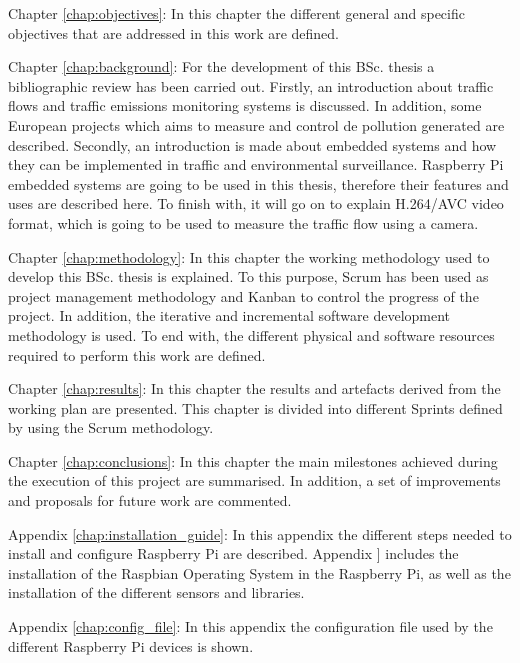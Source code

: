 \begin{definitionlist}
	\item[Chapter \ref{chap:objectives}: \nameref{chap:objectives}] In this chapter the different general and specific objectives that are addressed in this work are defined.
	
	\item[Chapter \ref{chap:background}: \nameref{chap:background}] For the development of this \ac{BSc.} thesis a bibliographic review has been carried out. Firstly, an introduction about traffic flows and traffic emissions monitoring systems is discussed. In addition, some European projects which aims to measure and control de pollution generated are described. Secondly, an introduction is made about embedded systems and how they can be implemented in traffic and environmental surveillance. Raspberry Pi embedded systems are going to be used in this thesis, therefore their features and uses are described here. To finish with, it will go on to explain H.264/AVC video format, which is going to be used to measure the traffic flow using a camera.
	
	\item[Chapter \ref{chap:methodology}: \nameref{chap:methodology}] In this chapter the working methodology used to develop this \ac{BSc.} thesis is explained. To this purpose, Scrum has been used as project management methodology and Kanban to control the progress of the project. In addition, the iterative and incremental software development methodology is used. To end with, the different physical and software resources required to perform this work are defined.
	
	\item[Chapter \ref{chap:results}: \nameref{chap:results}] In this chapter the results and artefacts derived from the working plan are presented. This chapter is divided into different Sprints defined by using the Scrum methodology.
	
	\item[Chapter \ref{chap:conclusions}: \nameref{chap:conclusions}] In this chapter the main milestones achieved during the execution of this project are summarised. In addition, a set of improvements and proposals for future work are commented. 
	
	\item[Appendix \ref{chap:installation_guide}: \nameref{chap:installation_guide}] In this appendix the different steps needed to install and configure Raspberry Pi are described.  Appendix ] includes the installation of the Raspbian Operating System in the Raspberry Pi, as well as the installation of the different sensors and libraries.
	
	\item[Appendix \ref{chap:config_file}: \nameref{chap:config_file}] In this appendix the configuration file used by the different Raspberry Pi devices is shown.
\end{definitionlist}



